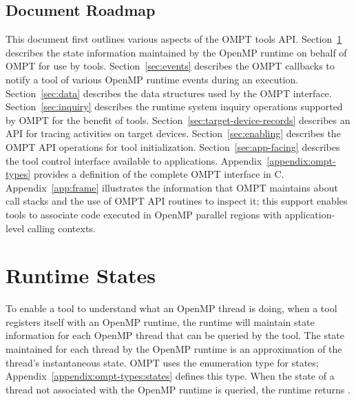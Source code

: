 \documentclass{article}
\begin{document}
\subsection{Document Roadmap}
This document first outlines various aspects of the OMPT tools API. 
Section~\ref{sec:states} describes the state information maintained by the OpenMP runtime on behalf of OMPT for use by tools.
Section~\ref{sec:events} describes the OMPT callbacks to notify a tool of various OpenMP runtime events during an execution.
Section~\ref{sec:data} describes the data structures used by the OMPT interface.
Section~\ref{sec:inquiry} describes the runtime system inquiry operations supported by OMPT for the benefit of tools.
Section~\ref{sec:target-device-records} describes an API for tracing activities on target devices.
Section~\ref{sec:enabling} describes the OMPT API operations for tool initialization.
Section~\ref{sec:app-facing} describes the tool control interface available to applications.
Appendix~\ref{appendix:ompt-types} provides a definition of the complete OMPT interface in C.
Appendix~\ref{app:frame} illustrates the information that OMPT maintains about call stacks and the use of OMPT API routines to inspect it; this support enables tools to associate code executed in OpenMP parallel regions with  application-level calling contexts. 

\section{Runtime States} 
\label{sec:states} 

To enable a tool to understand what an OpenMP thread is doing, when a tool registers itself with an OpenMP runtime, the runtime 
will maintain state information for each OpenMP thread that can be queried by the tool. 
The state maintained for each thread by the OpenMP runtime is an
approximation of the thread's instantaneous state. 
OMPT uses the enumeration type  for states;
Appendix~\ref{appendix:ompt-types:states} defines this type.
When the state of a thread not associated with the OpenMP runtime is queried, the runtime returns 
.

\end{document}

